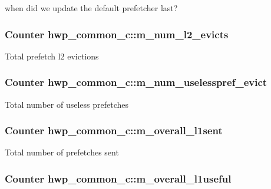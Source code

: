 \label{classhwp__common__c_a0b833904c9a0040d1a2c7b257a2864da}
when did we update the default prefetcher last? \hypertarget{classhwp__common__c_ac6a0c9f2b85988328933352cae406531}{
\subsubsection[{m\_\-num\_\-l2\_\-evicts}]{\setlength{\rightskip}{0pt plus 5cm}Counter {\bf hwp\_\-common\_\-c::m\_\-num\_\-l2\_\-evicts}}}
\label{classhwp__common__c_ac6a0c9f2b85988328933352cae406531}
Total prefetch l2 evictions \hypertarget{classhwp__common__c_aba0eb14ce388c2843221e3f642a580f6}{
\subsubsection[{m\_\-num\_\-uselesspref\_\-evict}]{\setlength{\rightskip}{0pt plus 5cm}Counter {\bf hwp\_\-common\_\-c::m\_\-num\_\-uselesspref\_\-evict}}}
\label{classhwp__common__c_aba0eb14ce388c2843221e3f642a580f6}
Total number of useless prefetches \hypertarget{classhwp__common__c_a3339e0c2bdd7d61b8149690b266e4756}{
\subsubsection[{m\_\-overall\_\-l1sent}]{\setlength{\rightskip}{0pt plus 5cm}Counter {\bf hwp\_\-common\_\-c::m\_\-overall\_\-l1sent}}}
\label{classhwp__common__c_a3339e0c2bdd7d61b8149690b266e4756}
Total number of prefetches sent \hypertarget{classhwp__common__c_af23abcaf04aa6842a3a083d085ee1c37}{
\subsubsection[{m\_\-overall\_\-l1useful}]{\setlength{\rightskip}{0pt plus 5cm}Counter {\bf hwp\_\-common\_\-c::m\_\-overall\_\-l1useful}}}
